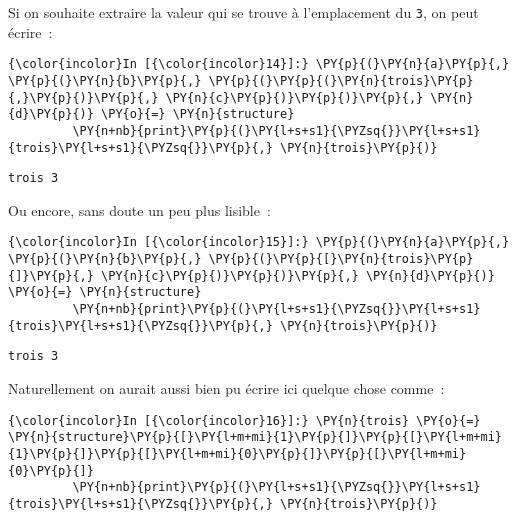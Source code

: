     Si on souhaite extraire la valeur qui se trouve à l'emplacement du
\texttt{3}, on peut écrire~:

    \begin{Verbatim}[commandchars=\\\{\}]
{\color{incolor}In [{\color{incolor}14}]:} \PY{p}{(}\PY{n}{a}\PY{p}{,} \PY{p}{(}\PY{n}{b}\PY{p}{,} \PY{p}{(}\PY{p}{(}\PY{n}{trois}\PY{p}{,}\PY{p}{)}\PY{p}{,} \PY{n}{c}\PY{p}{)}\PY{p}{)}\PY{p}{,} \PY{n}{d}\PY{p}{)} \PY{o}{=} \PY{n}{structure}
         \PY{n+nb}{print}\PY{p}{(}\PY{l+s+s1}{\PYZsq{}}\PY{l+s+s1}{trois}\PY{l+s+s1}{\PYZsq{}}\PY{p}{,} \PY{n}{trois}\PY{p}{)}
\end{Verbatim}


    \begin{Verbatim}[commandchars=\\\{\}]
trois 3

    \end{Verbatim}

    Ou encore, sans doute un peu plus lisible~:

    \begin{Verbatim}[commandchars=\\\{\}]
{\color{incolor}In [{\color{incolor}15}]:} \PY{p}{(}\PY{n}{a}\PY{p}{,} \PY{p}{(}\PY{n}{b}\PY{p}{,} \PY{p}{(}\PY{p}{[}\PY{n}{trois}\PY{p}{]}\PY{p}{,} \PY{n}{c}\PY{p}{)}\PY{p}{)}\PY{p}{,} \PY{n}{d}\PY{p}{)} \PY{o}{=} \PY{n}{structure}
         \PY{n+nb}{print}\PY{p}{(}\PY{l+s+s1}{\PYZsq{}}\PY{l+s+s1}{trois}\PY{l+s+s1}{\PYZsq{}}\PY{p}{,} \PY{n}{trois}\PY{p}{)}
\end{Verbatim}


    \begin{Verbatim}[commandchars=\\\{\}]
trois 3

    \end{Verbatim}

    Naturellement on aurait aussi bien pu écrire ici quelque chose comme~:

    \begin{Verbatim}[commandchars=\\\{\}]
{\color{incolor}In [{\color{incolor}16}]:} \PY{n}{trois} \PY{o}{=} \PY{n}{structure}\PY{p}{[}\PY{l+m+mi}{1}\PY{p}{]}\PY{p}{[}\PY{l+m+mi}{1}\PY{p}{]}\PY{p}{[}\PY{l+m+mi}{0}\PY{p}{]}\PY{p}{[}\PY{l+m+mi}{0}\PY{p}{]}
         \PY{n+nb}{print}\PY{p}{(}\PY{l+s+s1}{\PYZsq{}}\PY{l+s+s1}{trois}\PY{l+s+s1}{\PYZsq{}}\PY{p}{,} \PY{n}{trois}\PY{p}{)}
\end{Verbatim}


